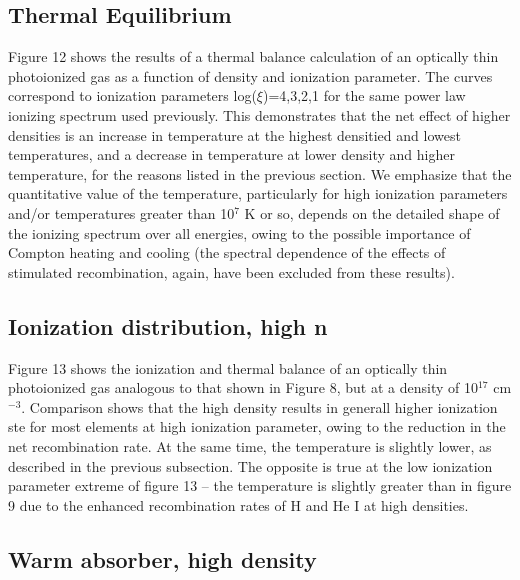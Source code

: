 \subsection{Thermal Equilibrium}

Figure 12 shows the results of a thermal balance calculation of an optically 
thin photoionized gas as a function of density and ionization 
parameter.  The curves correspond to ionization parameters log($\xi$)=4,3,2,1
for the same power law ionizing spectrum used previously.  
This demonstrates that the net effect of higher densities is 
an increase in temperature at the highest densitied and lowest temperatures,
and a decrease in temperature at lower density and higher temperature, 
for the reasons listed in the 
previous section.  We emphasize that the quantitative value of the 
temperature, particularly for high ionization parameters and/or 
temperatures greater than 10$^7$ K or so, depends on the detailed
shape of the ionizing spectrum over all energies, owing to the 
possible importance of Compton heating and cooling (the spectral 
dependence of the effects of stimulated recombination, again, have been 
excluded from these results).

\subsection{Ionization distribution, high n}

Figure 13 shows the ionization and thermal balance of an optically 
thin photoionized gas analogous to that shown in Figure 8, but 
at a density of 10$^{17}$ cm$^{-3}$.  Comparison shows that the high 
density results in generall higher ionization ste for most elements at high
ionization parameter, owing to the reduction in the net recombination 
rate.  At the same time, the temperature is slightly lower,  as described 
in the previous subsection.  The opposite is true at the low ionization parameter
extreme of figure 13 -- the temperature is slightly greater than 
in figure 9 due to the enhanced recombination rates of H and He I 
at high densities.


\subsection{Warm absorber, high density}

